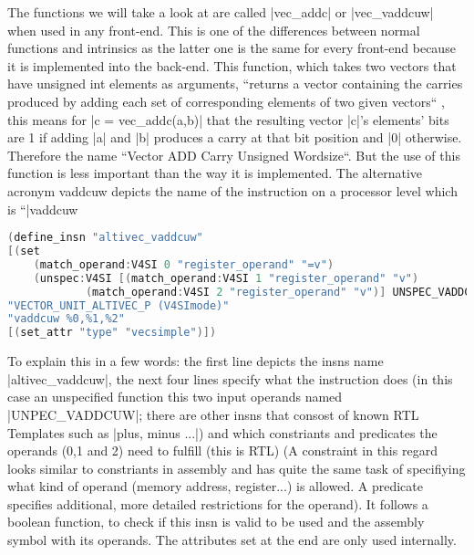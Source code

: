 The functions we will take a look at are called |vec_addc| or |vec_vaddcuw| when used in any front-end. This is one of the differences between normal functions and intrinsics as the latter one is the same for every front-end because it is implemented into the back-end.
This function, which takes two vectors that have unsigned int elements as arguments, ``returns a vector containing the carries produced by adding each set of corresponding elements of two given vectors`` , this means for |c = vec_addc(a,b)| that the resulting vector |c|'s elements' bits are 1 if adding |a| and |b| produces a carry at that bit position and |0| otherwise. Therefore the name ``Vector ADD Carry Unsigned Wordsize``. But the use of this function is less important than the way it is implemented.
The alternative acronym vaddcuw depicts the name of the instruction on a processor level which is ``|vaddcuw  %
\begin{lstlisting}[language=C++,basicstyle=\ttfamily\scriptsize,keywordstyle=\color{red}]
(define_insn "altivec_vaddcuw"
[(set
	(match_operand:V4SI 0 "register_operand" "=v")
	(unspec:V4SI [(match_operand:V4SI 1 "register_operand" "v")
			(match_operand:V4SI 2 "register_operand" "v")] UNSPEC_VADDCUW))]
"VECTOR_UNIT_ALTIVEC_P (V4SImode)"
"vaddcuw %0,%1,%2"
[(set_attr "type" "vecsimple")])
\end{lstlisting}
To explain this in a few words: the first line depicts the insns name |altivec_vaddcuw|, the next four lines specify what the instruction does (in this case an unspecified function this two input operands named |UNPEC_VADDCUW|; there are other insns that consost of known RTL Templates such as |plus, minus ...|)  and which constriants and predicates the operands (0,1 and 2) need to fulfill (this is RTL) (A constraint in this regard looks similar to constriants in assembly and has quite the same task of specifiying what kind of operand (memory address, register...) is allowed. A predicate specifies additional, more detailed restrictions for the operand). It follows a boolean function, to check if this insn is valid to be used and the assembly symbol with its operands. The attributes set at the end are only used internally.

